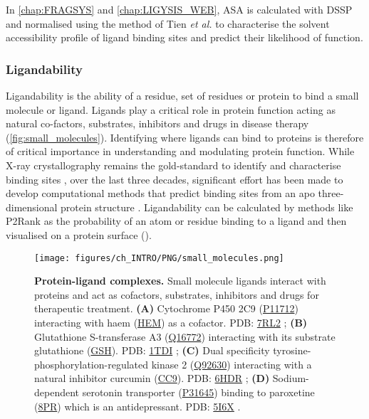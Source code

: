 In \autoref{chap:FRAGSYS} and \autoref{chap:LIGYSIS_WEB}, ASA is calculated with DSSP \cite{KABSCH_1983_DSSP} and normalised using the method of Tien \textit{et al.} \cite{TIEN_2013_RSA} to characterise the solvent accessibility profile of ligand binding sites and predict their likelihood of function.

\subsubsection{Ligandability}

Ligandability is the ability of a residue, set of residues or protein to bind a small molecule or ligand. Ligands play a critical role in protein function acting as natural co-factors, substrates, inhibitors and drugs in disease therapy (\autoref{fig:small_molecules}). Identifying where ligands can bind to proteins is therefore of critical importance in understanding and modulating protein function. While X-ray crystallography remains the gold-standard to identify and characterise binding sites \cite{REES_2004_FBLD}, over the last three decades, significant effort has been made to develop computational methods that predict binding sites from an apo three-dimensional protein structure \cite{VOLKAMER_2010_TOPOLOGY}. Ligandability can be calculated by methods like P2Rank \cite{KRIVAK_2018_P2RANK} as the probability of an atom or residue binding to a ligand and then visualised on a protein surface ().

\begin{figure}[htb!]
    \centering
    \texttt{[image: figures/ch\_INTRO/PNG/small\_molecules.png]}
    \caption[Protein-ligand complexes]{\textbf{Protein-ligand complexes.} Small molecule ligands interact with proteins and act as cofactors, substrates, inhibitors and drugs for therapeutic treatment. \textbf{(A)} Cytochrome P450 2C9 (\href{https://www.uniprot.org/uniprotkb/P11712/entry}{P11712}) interacting with haem (\href{https://www.ebi.ac.uk/pdbe-srv/pdbechem/chemicalCompound/show/HEM}{HEM}) as a cofactor. PDB: \href{https://www.ebi.ac.uk/pdbe/entry/pdb/7RL2}{7RL2} \cite{PARIKH_2021_CYTOP450}; \textbf{(B)} Glutathione S-transferase A3 (\href{https://www.uniprot.org/uniprotkb/Q16772/entry}{Q16772}) interacting with its substrate glutathione (\href{https://www.ebi.ac.uk/pdbe-srv/pdbechem/chemicalCompound/show/GSH}{GSH}). PDB: \href{https://www.ebi.ac.uk/pdbe/entry/pdb/1tdi}{1TDI} \cite{GU_2004_GST}; \textbf{(C)} Dual specificity tyrosine-phosphorylation-regulated kinase 2 (\href{https://www.uniprot.org/uniprotkb/Q92630/entry}{Q92630}) interacting with a natural inhibitor curcumin (\href{https://www.ebi.ac.uk/pdbe-srv/pdbechem/chemicalCompound/show/CC9}{CC9}). PDB: \href{https://www.ebi.ac.uk/pdbe/entry/pdb/6hdr}{6HDR} \cite{PDB_6HDR}; \textbf{(D)} Sodium-dependent serotonin transporter (\href{https://www.uniprot.org/uniprotkb/P31645/entry}{P31645}) binding to paroxetine (\href{https://www.ebi.ac.uk/pdbe-srv/pdbechem/chemicalCompound/show/8PR}{8PR}) which is an antidepressant. PDB: \href{https://www.ebi.ac.uk/pdbe/entry/pdb/5i6x}{5I6X} \cite{COLEMAN_2016_PAROXETIN}.}
    \label{fig:small_molecules}
\end{figure}

